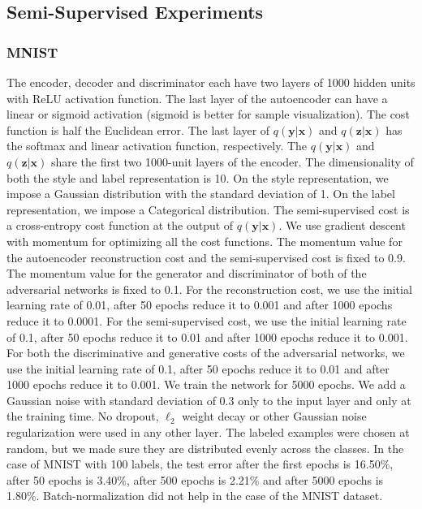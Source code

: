 \documentclass{article}
\begin{document}
\begin{appendices}
\subsection{Semi-Supervised Experiments}
\subsubsection{MNIST}\label{mnist-semi}
The encoder, decoder and discriminator each have two layers of 1000 hidden units with ReLU activation function. The last layer of the autoencoder can have a linear or sigmoid activation (sigmoid is better for sample visualization). The cost function is half the Euclidean error. The last layer of $q(\mathbf{y}|\mathbf{x})$ and $q(\mathbf{z}|\mathbf{x})$ has the softmax and linear activation function, respectively. The $q(\mathbf{y}|\mathbf{x})$ and $q(\mathbf{z}|\mathbf{x})$ share the first two 1000-unit layers of the encoder. The dimensionality of both the style and label representation is 10. On the style representation, we impose a Gaussian distribution with the standard deviation of 1. On the label representation, we impose a Categorical distribution. The semi-supervised cost is a cross-entropy cost function at the output of $q(\mathbf{y}|\mathbf{x})$. We use gradient descent with momentum for optimizing all the cost functions. The momentum value for the autoencoder reconstruction cost and the semi-supervised cost is fixed to 0.9. The momentum value for the generator and discriminator of both of the adversarial networks is fixed to 0.1. For the reconstruction cost, we use the initial learning rate of 0.01, after 50 epochs reduce it to 0.001 and after 1000 epochs reduce it to 0.0001. For the semi-supervised cost, we use the initial learning rate of 0.1, after 50 epochs reduce it to 0.01 and after 1000 epochs reduce it to 0.001. For both the discriminative and generative costs of the adversarial networks, we use the initial learning rate of 0.1, after 50 epochs reduce it to 0.01 and after 1000 epochs reduce it to 0.001. We train the network for 5000 epochs. We add a Gaussian noise with standard deviation of 0.3 only to the input layer and only at the training time. No dropout, $\ell_2$ weight decay or other Gaussian noise regularization were used in any other layer. The labeled examples were chosen at random, but we made sure they are distributed evenly across the classes. In the case of MNIST with 100 labels, the test error after the first epochs is 16.50\%, after 50 epochs is 3.40\%, after 500 epochs is 2.21\% and after 5000 epochs is 1.80\%. Batch-normalization \citep{batch} did not help in the case of the MNIST dataset.


\end{appendices}
\end{document}

